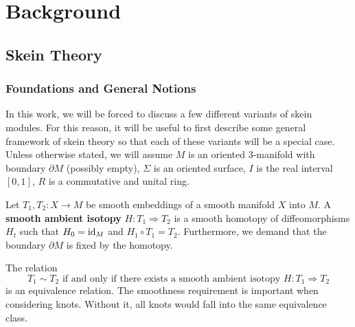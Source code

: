 \chapter{Background}


\section{Skein Theory}

\subsection{Foundations and General Notions}
In this work, we will be forced to discuss a few different variants of skein modules. For this reason, it will be useful to first describe some general framework of skein theory so that each of these variants will be a special case. Unless otherwise stated, we will assume $M$ is an oriented $3$-manifold with boundary $\partial M$ (possibly empty), $\Sigma$ is an oriented surface, $I$ is the real interval $[0,1]$, $R$ is a commutative and unital ring. 

\begin{definition}
    Let $T_1, T_2: X \to M$ be smooth embeddings of a smooth manifold $X$ into $M$. A \textbf{smooth ambient isotopy} $H: T_1 \Rightarrow T_2$ is a smooth homotopy of diffeomorphisms $H_t$ such that $H_0={\rm{id}}_M$ and $H_1 \circ T_1 = T_2$. Furthermore, we demand that the boundary $\partial M$ is fixed by the homotopy. 
\end{definition}

The relation 
\[
T_1 \sim T_2 \textrm{ if and only if there exists a smooth ambient isotopy } H: T_1 \Rightarrow T_2
\]
is an equivalence relation. The smoothness requirement is important when considering knots. Without it, all knots would fall into the same equivalence class.

